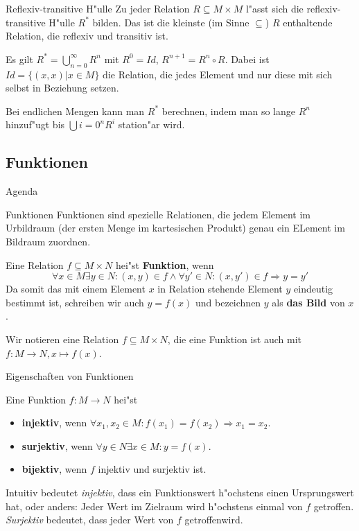 \documentclass{beamer}
\begin{document}
\begin{frame}{Reflexiv-transitive H"ulle}
Zu jeder Relation $R\subseteq M\times M$ l"asst sich die reflexiv-transitive H"ulle $R^*$ bilden. Das ist die kleinste (im Sinne $\subseteq$) $R$ enthaltende Relation, die reflexiv und transitiv ist.

Es gilt $R^*=\bigcup_{n=0}^\infty R^n$ mit $R^0=Id$, $R^{n+1}=R^n\circ R$. Dabei ist $Id=\{(x,x)|x\in M\}$ die Relation, die jedes Element und nur diese mit sich selbst in Beziehung setzen. 

Bei endlichen Mengen kann man $R^*$ berechnen, indem man so lange $R^n$ hinzuf"ugt bis $\bigcup{i=0}^n R^i$ station"ar wird.
\end{frame}

\subsection{Funktionen}

\begin{frame}{Agenda}
   
    
  \tableofcontents[currentsection]
  \end{frame}
\begin{frame}{Funktionen}
  Funktionen sind spezielle Relationen, die jedem Element im Urbildraum (der ersten Menge im kartesischen Produkt) genau ein ELement im Bildraum zuordnen.
  \begin{definition}[Funktionen]
    Eine Relation $f\subseteq M\times N$ hei"st \textbf{Funktion}, wenn \[\forall x\in M \exists y\in N: (x,y)\in f\wedge \forall y'\in N:(x,y')\in f\Rightarrow y=y'\]
    Da somit das mit einem Element $x$ in Relation stehende Element $y$ eindeutig bestimmt ist, schreiben wir auch $y=f(x)$ und bezeichnen $y$ als \textbf{das Bild} von $x$.
  \end{definition}
  Wir notieren eine Relation $f\subseteq M\times N$, die eine Funktion ist auch mit $f:M\to N, x\mapsto f(x)$.
\end{frame}


\begin{frame}{Eigenschaften von Funktionen}
\begin{definition}
  Eine Funktion $f:M\to N$ hei"st 
  \begin{itemize}
    \item \textbf{injektiv}, wenn $\forall x_1,x_2\in M:f(x_1)=f(x_2)\Rightarrow x_1=x_2$.
    \item \textbf{surjektiv}, wenn $\forall y\in N\exists x\in M:y=f(x)$.
    \item \textbf{bijektiv}, wenn $f$ injektiv und surjektiv ist.
  \end{itemize}
\end{definition}
Intuitiv bedeutet \textit{injektiv}, dass ein Funktionswert h"ochstens einen Ursprungswert hat, oder anders: Jeder Wert im Zielraum wird h"ochstens einmal von $f$ \glqq getroffen\grqq. \textit{Surjektiv} bedeutet, dass jeder Wert von $f$ \glqq getroffen\grqq wird.
\end{frame}
\end{document}
